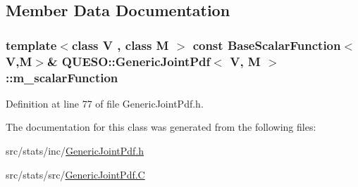 \subsection{Member Data Documentation}
\hypertarget{class_q_u_e_s_o_1_1_generic_joint_pdf_a26902b8f386e73c0d6bb39554ae4ba29}{
\subsubsection[{m\-\_\-scalar\-Function}]{\setlength{\rightskip}{0pt plus 5cm}template$<$class V , class M $>$ const {\bf Base\-Scalar\-Function}$<$V,M$>$\& {\bf Q\-U\-E\-S\-O\-::\-Generic\-Joint\-Pdf}$<$ V, M $>$\-::m\-\_\-scalar\-Function\hspace{0.3cm}{\ttfamily [protected]}}}\label{class_q_u_e_s_o_1_1_generic_joint_pdf_a26902b8f386e73c0d6bb39554ae4ba29}


Definition at line 77 of file Generic\-Joint\-Pdf.\-h.



The documentation for this class was generated from the following files\-:\begin{DoxyCompactItemize}
\item 
src/stats/inc/\hyperlink{_generic_joint_pdf_8h}{Generic\-Joint\-Pdf.\-h}\item 
src/stats/src/\hyperlink{_generic_joint_pdf_8_c}{Generic\-Joint\-Pdf.\-C}\end{DoxyCompactItemize}
